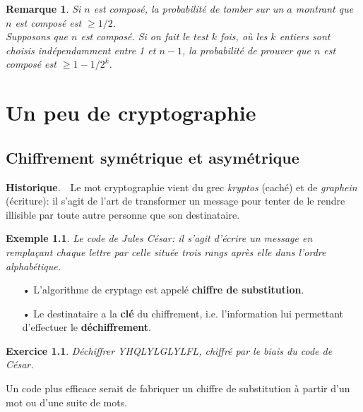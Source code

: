 \documentclass[12pt]{report}
\newtheorem*{ex}{Exemple}
\newtheorem*{exo}{Exercice}
\newtheorem*{rem}{Remarque}
\begin{document}
\begin{rem}
Si $n$ est composé, la probabilité de tomber sur un $a$ montrant que $n$ est composé est  $\geq 1/2$. \\
Supposons que $n$ est composé. Si on fait le test $k$ fois, où les $k$ entiers sont choisis indépendamment entre 1 et $n-1$, la probabilité de prouver que $n$ est composé est $\geq 1-1/2^k$.
\end{rem}

\chapter{Un peu de cryptographie}


\section{Chiffrement symétrique et asymétrique}


{\textbf{Historique}}.\ \ Le mot cryptographie vient du grec \textit{kryptos} (caché) et de \textit{graphein} (écriture): il s'agit de l'art de transformer un message pour tenter de le rendre illisible par toute autre personne que son destinataire.

\begin{ex}
Le code de Jules César: il s'agit d'écrire un message en remplaçant chaque lettre par celle située trois rangs après elle dans l'ordre alphabétique.
\end{ex}

\begin{itemize}
\item[•] L'algorithme de cryptage est appelé \textbf{chiffre de substitution}.
\item[•] Le destinataire a la \textbf{clé} du chiffrement, i.e. l'information lui permettant d'effectuer le \textbf{déchiffrement}.
\end{itemize}

 

\begin{exo}
Déchiffrer YHQLYLGLYLFL, chiffré par le biais du code de César.
\end{exo}

Un code plus efficace serait de fabriquer un chiffre de substitution à partir d'un mot ou d'une suite de mots.
\end{document}
